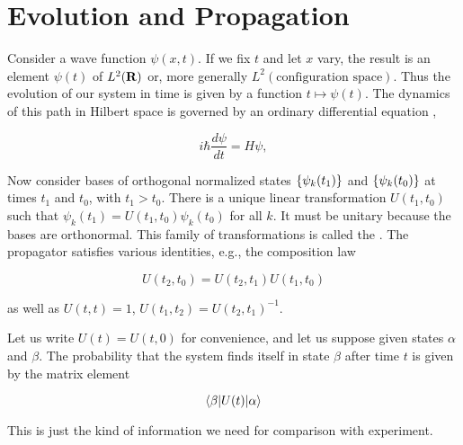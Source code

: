 
\begin{mathmacro}
\newcommand{\bra}[0]{\langle}
\newcommand{\ket}[0]{\rangle}
\newcommand{\caF}[0]{\mathcal{F}}
\newcommand{\bbR}[0]{\bf{R}}
\newcommand{\set}[1]{\{#1\}}
\end{mathmacro}

\setcounter{section}{10}

\section{Evolution and Propagation}

\innertableofcontents

Consider a wave function $\psi(x,t)$.  If we fix $t$ and let $x$ vary, the result is an element $\psi(t)$ of $L^2(\bbR)$ or, more generally $L^2(\text{configuration space})$.  Thus the evolution of our system in time is given by a function $t \mapsto \psi(t)$.  The dynamics of this path in Hilbert space is governed by an ordinary differential equation ,

\begin{equation}
\label{schreq}
i\hbar\frac{d\psi}{dt} = H\psi,
\end{equation}

Now consider bases of orthogonal normalized states $\set{\psi_k(t_1)}$ and $\set{\psi_k(t_0)}$ at times $t_1$ and $t_0$, with $t_1 > t_0$.  There is a unique linear transformation $U(t_1,t_0)$ such that $\psi_k(t_1) = U(t_1,t_0)\psi_k(t_0)$ for all $k$.  It must be unitary because the bases are orthonormal.  This family of transformations is called the .  The propagator satisfies various identities, e.g., the composition law

\begin{equation}
U(t_2, t_0) = U(t_2, t_1)U(t_1, t_0)
\end{equation}

as well as $U(t,t) = 1$, $U(t_1,t_2) = U(t_2,t_1)^{-1}$.

Let us write $U(t) = U(t,0)$ for convenience, and let us suppose given states $\alpha$ and $\beta$.  The probability that the system finds itself in state $\beta$ after time $t$ is given by the matrix element

\begin{equation}
\bra \beta | U(t) | \alpha \ket
\end{equation}

This is just the kind of information we need for comparison with experiment.


